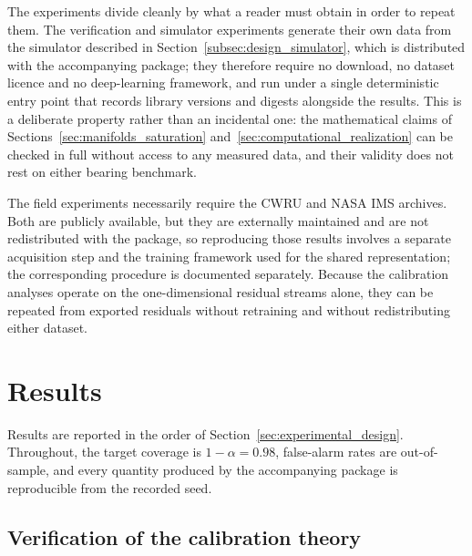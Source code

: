 \documentclass[a4paper]{cas-sc}
\begin{document}
The experiments divide cleanly by what a reader must obtain in order to repeat
them. The verification and simulator experiments generate their own data from
the simulator described in
Section~\ref{subsec:design_simulator}, which is distributed with the
accompanying package; they therefore require no download, no dataset licence
and no deep-learning framework, and run under a single deterministic entry
point that records library versions and digests alongside the results. This is
a deliberate property rather than an incidental one: the mathematical claims of
Sections~\ref{sec:manifolds_saturation}
and~\ref{sec:computational_realization} can be checked in full without access
to any measured data, and their validity does not rest on either bearing
benchmark.

The field experiments necessarily require the CWRU and NASA IMS archives.
Both are publicly available, but they are externally maintained and are not
redistributed with the package, so reproducing those results involves a
separate acquisition step and the training framework used for the shared
representation; the corresponding procedure is documented separately. Because
the calibration analyses operate on the one-dimensional residual streams
alone, they can be repeated from exported residuals without retraining and
without redistributing either dataset.

\section{Results}
\label{sec:results}

Results are reported in the order of
Section~\ref{sec:experimental_design}. Throughout, the target coverage is
\(1-\alpha=0.98\), false-alarm rates are out-of-sample, and every quantity
produced by the accompanying package is reproducible from the recorded seed.

\subsection{Verification of the calibration theory}
\label{subsec:results_verification}
\end{document}
